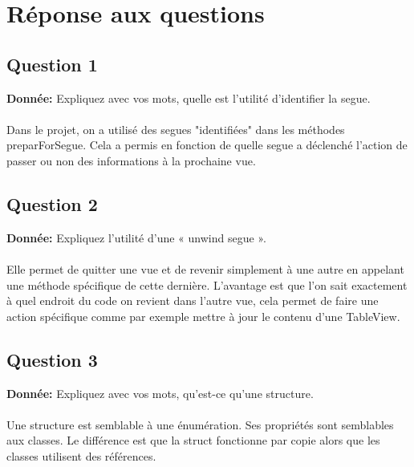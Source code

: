 \section{Réponse aux questions}
\subsection{Question 1}
\textbf{Donnée: }Expliquez avec vos mots, quelle est l’utilité d’identifier la segue.\\\\
Dans le projet, on a utilisé des segues "identifiées" dans les méthodes preparForSegue. Cela a permis en fonction de quelle segue a déclenché l'action de passer ou non des informations à la prochaine vue.

\subsection{Question 2}
\textbf{Donnée: }Expliquez l’utilité d’une « unwind segue ».\\\\
Elle permet de quitter une vue et de revenir simplement à une autre en appelant une méthode spécifique de cette dernière. L'avantage est que l'on sait exactement à quel endroit du code on revient dans l'autre vue, cela permet de faire une action spécifique comme par exemple mettre à jour le contenu d'une TableView.

\subsection{Question 3}
\textbf{Donnée: }Expliquez avec vos mots, qu’est-ce qu’une structure.\\\\
Une structure est semblable à une énumération. Ses propriétés sont semblables aux classes. Le différence est que la struct fonctionne par copie alors que les classes utilisent des références.

